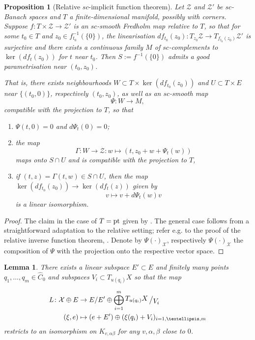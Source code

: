 \documentclass[11pt,psamsfonts, oneside, reqno]{amsart}
\newcommand{\sub}{\subset}%
\newcommand{\modulo}[2]{{\raisebox{.2em}{$#1$}\left/\raisebox{-.2em}{$#2$}\right.}}%
\newcommand{\inv}{^{-1}}
\newcommand{\cl}{\colon}
\newcommand{\pt}{\normalfont\text{pt}}
\newcommand{\cX}{\mathcal{X}}
\newcommand{\cZ}{\mathcal{Z}}
\newcommand{\wh}{\widehat}
\newtheorem{lemma}[theorem]{Lemma}
\newtheorem{proposition}[theorem]{Proposition}
\theoremstyle{definition}
\theoremstyle{remark}
\numberwithin{equation}{section}
\begin{document}
\begin{proposition}[Relative $sc$-implicit function theorem]\label{prop:sc-implicit-function} Let $\cZ$ and $\cZ'$ be $sc$-Banach spaces and $T$ a finite-dimensional manifold, possibly with corners. Suppose $f \cl T\times \cZ\to \cZ'$ is an $sc$-smooth Fredholm map relative to $T$, so that for some $t_0 \in T$ and $z_0 \in f_{t_0}\inv(\{0\})$, the linearisation $df_{t_0}(z_0)\cl T_{z_0}\cZ\to T_{f_{t_0}(z_0)} \cZ'$ is surjective and there exists a continuous family $M$ of $sc$-complements to $\ker(df_t(z_0))$ for $t$ near $t_0$. Then $S := f\inv(\{0\})$ admits a \emph{good parametrisation} near $(t_0,z_0)$.\par That is, there exists neighbourhoods $W\sub T\times \ker(df_{t_0}(z_0))$ and $U\sub T\times E$ near $\{(t_0,0)\}$, respectively $(t_0,z_0)$, as well as an $sc$-smooth map
	$$\Psi \cl W\to M,$$\noindent 
	compatible with the projection to $T$, so that
	\begin{enumerate}[1),leftmargin=20pt,ref=\arabic*]
		\item\label{i:origin} $\Psi(t,0) = 0$ and $d\Psi_t(0) = 0$;
		\item\label{i:graph} the map $$\Gamma\cl W\to \cZ : w \mapsto (t,z_0 + w + \Psi_t(w))$$\noindent 
		maps onto $S\cap U$ and is compatible with the projection to $T$,
		\item\label{i:kernels} if $(t,z) = \Gamma(t,w)\in S\cap U$, then the map $\ker(df_{t_0}(z_0))\to \ker(df_t(z))$ given by 
		$$v\mapsto v + d\Psi_t(w)v$$\noindent
		is a linear isomorphism.
	\end{enumerate}
\end{proposition}

\begin{proof} The claim in the case of $T = \pt$ given by \cite[Theorem~4.6]{HWZ09}. The general case follows from a straightforward adaptation to the relative setting; refer e.g. to the proof of the relative inverse function theorem, \cite[Lemma~5.10]{Swa21}. Denote by $\Psi(\cdot)_\cX$, respectively $\Psi(\cdot)_\cX$ the composition of $\Psi$ with the projection onto the respective vector space.
\end{proof}

\begin{lemma}\label{} There exists a linear subspace $E'\sub E$ and finitely many points $q_1,\dots,q_m \in \wh C_0$ and subspaces $V_i\sub T_{u(q_i)}X$ so that the map 
	
	\begin{align*}\label{} L \cl \cX\oplus E&\to E/E'\oplus \bigoplus\limits_{i = 1}^m \modulo{T_{u(q_i)}X}{V_i} \\ (\xi,e) &\mapsto (e + E')\oplus (\xi(q_i)+ V_i)_{i = 1,\dots,m}\end{align*}
	restricts to an isomorphism on $K_{v,\alpha\beta}$ for any $v,\alpha,\beta$ close to $0$. 
\end{lemma}
\end{document}
